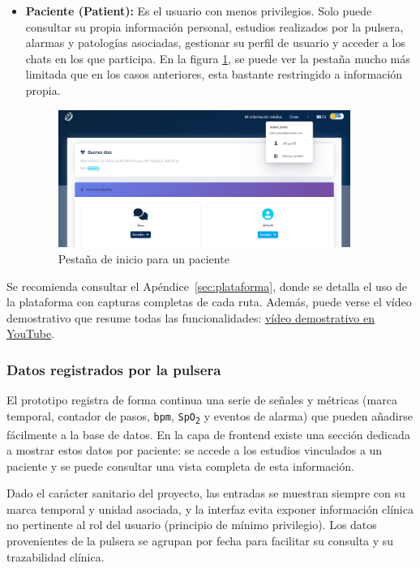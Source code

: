 \documentclass[12pt, a4paper]{article}
\begin{document}
\begin{itemize}
	
	\item \textbf{Paciente (Patient):}  
	Es el usuario con menos privilegios. Solo puede consultar su propia información personal, estudios realizados por la pulsera, alarmas y patologías asociadas, gestionar su perfil de usuario y acceder a los chats en los que participa. En la figura \ref{fig:paco}, se puede ver la pestaña mucho más limitada que en los casos anteriores, esta bastante restringido a información propia.
	
	
	\begin{figure}[htbp]
		\centering
		\includegraphics[width=0.9\textwidth]{images/pov_paciente.png}
		\caption[Ejemplo]{Pestaña de inicio para un paciente}
		\label{fig:paco}
	\end{figure}
\end{itemize}

Se recomienda consultar el Apéndice~\ref{sec:plataforma}, donde se detalla el uso de la plataforma con capturas completas de cada ruta. Además, puede verse el vídeo demostrativo que resume todas las funcionalidades: \href{https://www.youtube.com/watch?v=w0fhrWlky6o}{vídeo demostrativo en YouTube}.

\subsubsection{Datos registrados por la pulsera}

El prototipo registra de forma continua una serie de señales y métricas (marca temporal, contador de pasos, \texttt{bpm}, \texttt{SpO\textsubscript{2}} y eventos de alarma) que pueden añadirse fácilmente a la base de datos. En la capa de frontend existe una sección dedicada a mostrar estos datos por paciente: se accede a los estudios vinculados a un paciente y se puede consultar una vista completa de esta información.

Dado el carácter sanitario del proyecto, las entradas se muestran siempre con su marca temporal y unidad asociada, y la interfaz evita exponer información clínica no pertinente al rol del usuario (principio de mínimo privilegio). Los datos provenientes de la pulsera se agrupan por fecha para facilitar su consulta y su trazabilidad clínica.
\end{document}
